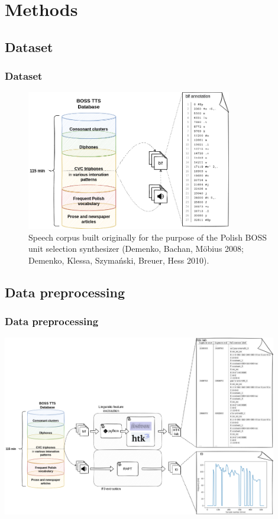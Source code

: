 \documentclass[a4paper,9pt]{beamer}
\theoremstyle{mytheoremstyle}
\begin{document}
\section{Methods}

\subsection{Dataset}


\begin{frame}
\frametitle{Dataset}
\begin{figure}
\begin{center}
  \includegraphics[width=0.8\textwidth]{res/dataset_blf}
\end{center}
	\caption{Speech corpus built originally for the purpose of the Polish BOSS unit selection synthesizer (Demenko, Bachan, M{\"o}bius 2008; Demenko, Klessa, Szyma\'nski, Breuer, Hess 2010).}
\end{figure}
\end{frame}


\subsection{Data preprocessing}

\begin{frame}
\frametitle{Data preprocessing}
\begin{center}
  \includegraphics[width=0.9\textwidth]{res/dataset_preprocessing}
\end{center}
\end{frame}
\end{document}
